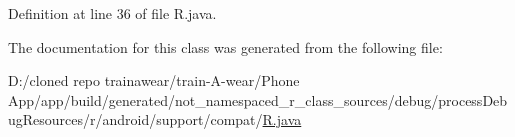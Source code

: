 Definition at line 36 of file R.\+java.



The documentation for this class was generated from the following file\+:\begin{DoxyCompactItemize}
\item 
D\+:/cloned repo trainawear/train-\/\+A-\/wear/\+Phone App/app/build/generated/not\+\_\+namespaced\+\_\+r\+\_\+class\+\_\+sources/debug/process\+Debug\+Resources/r/android/support/compat/\mbox{\hyperlink{process_debug_resources_2r_2android_2support_2compat_2_r_8java}{R.\+java}}\end{DoxyCompactItemize}
